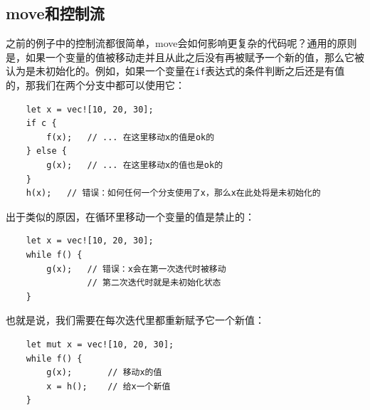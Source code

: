 \subsection{move和控制流}
之前的例子中的控制流都很简单，move会如何影响更复杂的代码呢？通用的原则是，如果一个变量的值被移动走并且从此之后没有再被赋予一个新的值，那么它被认为是未初始化的。例如，如果一个变量在\texttt{if}表达式的条件判断之后还是有值的，那我们在两个分支中都可以使用它：
\begin{verbatim}
    let x = vec![10, 20, 30];
    if c {
        f(x);   // ... 在这里移动x的值是ok的
    } else {
        g(x);   // ... 在这里移动x的值也是ok的
    }
    h(x);   // 错误：如何任何一个分支使用了x，那么x在此处将是未初始化的
\end{verbatim}

出于类似的原因，在循环里移动一个变量的值是禁止的：
\begin{verbatim}
    let x = vec![10, 20, 30];
    while f() {
        g(x);   // 错误：x会在第一次迭代时被移动
                // 第二次迭代时就是未初始化状态 
    }
\end{verbatim}

也就是说，我们需要在每次迭代里都重新赋予它一个新值：
\begin{verbatim}
    let mut x = vec![10, 20, 30];
    while f() {
        g(x);       // 移动x的值
        x = h();    // 给x一个新值
    }
\end{verbatim}



















